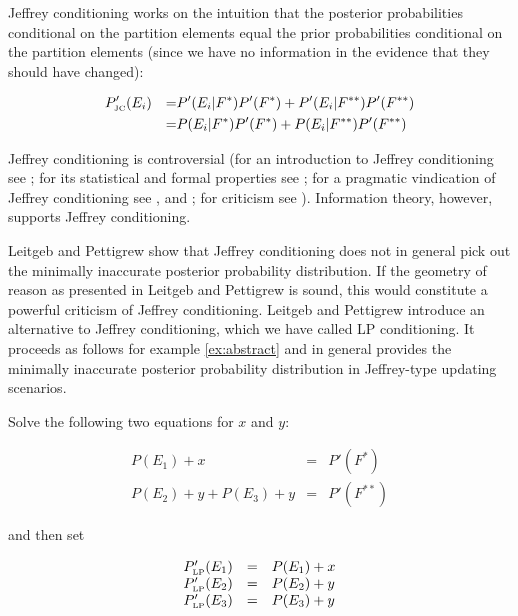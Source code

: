 \documentclass[11pt]{article}
\begin{document}
Jeffrey conditioning works on the intuition that the posterior
probabilities conditional on the partition elements equal the prior
probabilities conditional on the partition elements (since we have no
information in the evidence that they should have changed):

\begin{align}
  \label{eq:jc}
  &P'_{\mbox{\tiny JC}}(E_{i})&=&P'(E_{i}|F^{*})P'(F^{*})+P'(E_{i}|F^{**})P'(F^{**})\notag \\
  &&=&P(E_{i}|F^{*})P'(F^{*})+P(E_{i}|F^{**})P'(F^{**})
\end{align}

Jeffrey conditioning is controversial (for an introduction to Jeffrey
conditioning see ; for its statistical and
formal properties see ; for a pragmatic
vindication of Jeffrey conditioning see , and
; for criticism see
). Information theory, however, supports
Jeffrey conditioning. 

Leitgeb and Pettigrew show that Jeffrey conditioning does not in
general pick out the minimally inaccurate posterior probability
distribution. If the geometry of reason as presented in Leitgeb and
Pettigrew is sound, this would constitute a powerful criticism of
Jeffrey conditioning. Leitgeb and Pettigrew introduce an alternative
to Jeffrey conditioning, which we have called LP conditioning. It
proceeds as follows for example \ref{ex:abstract} and in general
provides the minimally inaccurate posterior probability distribution
in Jeffrey-type updating scenarios.

Solve the following two equations for $x$ and $y$:

\begin{equation}
  \label{eq:lpce}
  \begin{array}{rcl}
    P(E_{1})+x&=&P'(F^{*}) \\
    P(E_{2})+y+P(E_{3})+y&=&P'(F^{**})
  \end{array}
\end{equation}

and then set

\begin{equation}
  \label{eq:lpcf}
  \begin{array}{rcl}
    P'_{\mbox{\tiny LP}}(E_{1})&=&P(E_{1})+x \\
    P'_{\mbox{\tiny LP}}(E_{2})&=&P(E_{2})+y \\
    P'_{\mbox{\tiny LP}}(E_{3})&=&P(E_{3})+y
  \end{array}
\end{equation}
\end{document}
